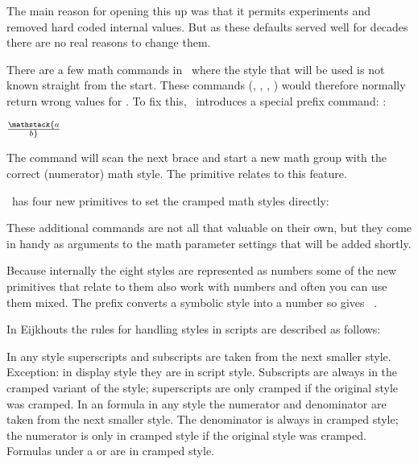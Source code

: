 The main reason for opening this up was that it permits experiments and removed
hard coded internal values. But as these defaults served well for decades there
are no real reasons to change them.

There are a few math commands in \TEX\ where the style that will be used is not
known straight from the start. These commands (\type {\over}, \type {\atop},
\typ {\overwithdelims}, \typ {\atopwithdelims}) would therefore normally return
wrong values for \type {\mathstyle}. To fix this, \LUATEX\ introduces a special
prefix command: \type {\mathstack}:

\starttyping
$\mathstack {a \over b}$
\stoptyping

The \type {\mathstack} command will scan the next brace and start a new math group
with the correct (numerator) math style. The \typ {\mathstackstyle} primitive
relates to this feature.

\LUATEX\ has four new primitives to set the cramped math styles directly:

\starttyping
\crampeddisplaystyle
\crampedtextstyle
\crampedscriptstyle
\crampedscriptscriptstyle
\stoptyping

These additional commands are not all that valuable on their own, but they come
in handy as arguments to the math parameter settings that will be added shortly.

Because internally the eight styles are represented as numbers some of the new
primitives that relate to them also work with numbers and often you can use them
mixed. The \typ {\tomathstyle} prefix converts a symbolic style into a number so
\typ {\number \tomathstyle \crampedscriptstyle} gives~\number \tomathstyle
\crampedscriptstyle.

In Eijkhouts  the rules for handling styles in scripts
are described as follows:

\startitemize
\startitem
    In any style superscripts and subscripts are taken from the next smaller style.
    Exception: in display style they are in script style.
\stopitem
\startitem
    Subscripts are always in the cramped variant of the style; superscripts are only
    cramped if the original style was cramped.
\stopitem
\startitem
    In an  formula in any style the numerator and denominator are
    taken from the next smaller style.
\stopitem
\startitem
    The denominator is always in cramped style; the numerator is only in cramped
    style if the original style was cramped.
\stopitem
\startitem
    Formulas under a \type {\sqrt} or \type {\overline} are in cramped style.
\stopitem
\stopitemize

